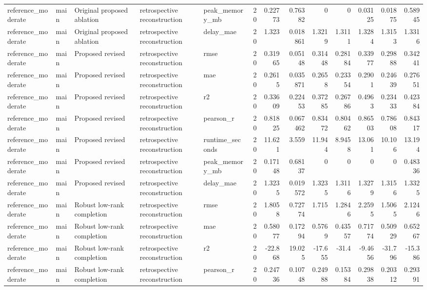 \begin{table}[!htbp]
{{\begin{tabular}{lllllrrrrrrrr}
reference_moderate & main & Original proposed ablation & retrospective reconstruction & peak_memory_mb & 20 & 0.22773 & 0.76382 & 0 & 0 & 0.03125 & 0.01875 & 0.58945 \\
reference_moderate & main & Original proposed ablation & retrospective reconstruction & delay_mae & 20 & 1.323 & 0.018861 & 1.3219 & 1.3111 & 1.3284 & 1.3153 & 1.3316 \\
reference_moderate & main & Proposed revised & retrospective reconstruction & rmse & 20 & 0.31965 & 0.05148 & 0.31448 & 0.28184 & 0.33977 & 0.29888 & 0.34241 \\
reference_moderate & main & Proposed revised & retrospective reconstruction & mae & 20 & 0.2615 & 0.035871 & 0.2658 & 0.23354 & 0.2901 & 0.24639 & 0.27651 \\
reference_moderate & main & Proposed revised & retrospective reconstruction & r2 & 20 & 0.33609 & 0.22453 & 0.37285 & 0.26786 & 0.4963 & 0.23433 & 0.42384 \\
reference_moderate & main & Proposed revised & retrospective reconstruction & pearson_r & 20 & 0.81825 & 0.067462 & 0.83472 & 0.80462 & 0.86503 & 0.78608 & 0.84317 \\
reference_moderate & main & Proposed revised & retrospective reconstruction & runtime_seconds & 20 & 11.621 & 3.559 & 11.944 & 8.9458 & 13.061 & 10.106 & 13.194 \\
reference_moderate & main & Proposed revised & retrospective reconstruction & peak_memory_mb & 20 & 0.17148 & 0.68137 & 0 & 0 & 0 & 0 & 0.48336 \\
reference_moderate & main & Proposed revised & retrospective reconstruction & delay_mae & 20 & 1.3235 & 0.019572 & 1.3235 & 1.3116 & 1.3279 & 1.3156 & 1.3325 \\
reference_moderate & main & Robust low-rank completion & retrospective reconstruction & rmse & 20 & 1.8058 & 0.72774 & 1.715 & 1.2846 & 2.2595 & 1.5065 & 2.1246 \\
reference_moderate & main & Robust low-rank completion & retrospective reconstruction & mae & 20 & 0.58077 & 0.17294 & 0.5769 & 0.43557 & 0.71774 & 0.50929 & 0.65267 \\
reference_moderate & main & Robust low-rank completion & retrospective reconstruction & r2 & 20 & -22.868 & 19.025 & -17.655 & -31.4 & -9.4656 & -31.796 & -15.386 \\
reference_moderate & main & Robust low-rank completion & retrospective reconstruction & pearson_r & 20 & 0.24736 & 0.10748 & 0.24988 & 0.15384 & 0.29838 & 0.20312 & 0.29391 \\

\end{tabular}}}
\end{table}
